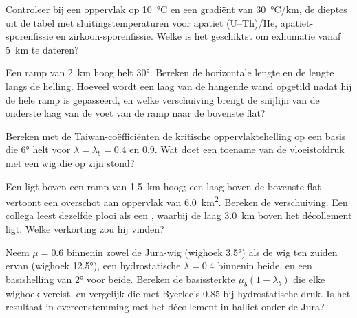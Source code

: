 \begin{exercise}[$\star$]\label{exo:b3:orogenic-wedges:3}
Controleer bij een oppervlak op \qty{10}{\celsius} en een gradiënt van \qty{30}{\celsius/km},
de dieptes uit de tabel met sluitingstemperaturen voor apatiet
(U--Th)/He, apatiet-sporenfissie en zirkoon-sporenfissie. Welke
 is het geschiktst om exhumatie vanaf \qty{5}{km} te dateren?
\end{exercise}

\begin{exercise}[$\star$]\label{exo:b3:orogenic-wedges:4}
Een ramp van \qty{2}{km} hoog helt \ang{30}. Bereken de horizontale lengte en de
lengte langs de helling. Hoeveel wordt een laag van de hangende wand opgetild nadat
hij de hele ramp is gepasseerd, en welke verschuiving brengt de snijlijn van de onderste
laag van de voet van de ramp naar de bovenste flat?
\end{exercise}

\begin{exercise}[$\star\star$]\label{exo:b3:orogenic-wedges:5}
Bereken met de Taiwan-coëfficiënten de kritische oppervlaktehelling op een basis
die \ang{6} helt voor $\lambda = \lambda_b = 0.4$ en $0.9$. Wat doet een
toename van de vloeistofdruk met een wig die op zijn  stond?
\end{exercise}

\begin{exercise}[$\star\star$]\label{exo:b3:orogenic-wedges:6}
Een  ligt boven een ramp van \qty{1.5}{km} hoog; een laag boven de
bovenste flat vertoont een overschot aan oppervlak van \qty{6.0}{km^2}. Bereken de verschuiving. Een collega
leest dezelfde plooi als een , waarbij de laag \qty{3.0}{km} boven
het décollement ligt. Welke verkorting zou hij vinden?
\end{exercise}

\begin{exercise}[$\star\star$]\label{exo:b3:orogenic-wedges:7}
Neem $\mu = 0.6$ binnenin zowel de Jura-wig (wighoek \ang{3.5}) als de wig ten
zuiden ervan (wighoek \ang{12.5}), een hydrostatische $\lambda = 0.4$ binnenin beide, en een
basishelling van \ang{2} voor beide. Bereken de basissterkte $\mu_b(1 -
\lambda_b)$ die elke wighoek vereist, en vergelijk die met Byerlee's $0.85$
bij hydrostatische druk. Is het resultaat in overeenstemming met het décollement in
halliet onder de Jura?
\end{exercise}

